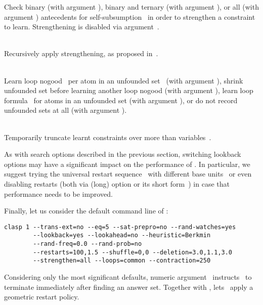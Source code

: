 \begin{description}
Check binary (with argument ),
binary and ternary (with argument ), or 
all (with argument ) antecedents for
self-subsumption~\cite{eenbie05a}
in order to strengthen a constraint to learn.
Strengthening is disabled via argument~.
\item[\code{--recursive-str}]~\\
Recursively apply strengthening, as proposed in~\cite{soreen05a}.
\item[\code{--loops common|distinct|shared|no}]~\\
Learn loop nogood~\cite{gekanesc07a} per atom in an unfounded set~\cite{gerosc91a}
(with argument ),
shrink unfounded set before learning another loop nogood
(with argument ),
learn loop formula~\cite{linzha04a} for atoms in an unfounded set
(with argument ),
or do not record unfounded sets at all
(with argument ).
\item[\code{--contraction \textit{n}}]~\\
Temporarily truncate learnt constraints over more than  variables~\cite{ryan04a}.
\end{description}
%
As with search options described in the previous section,
switching lookback options may have a significant impact on the
performance of \clasp.
In particular, we suggest trying the universal restart sequence~\cite{lusizu93a}
with different base units~ or even disabling restarts
(both via (long) option  or its short form~)
in case that performance needs to be improved.

Finally, let us consider the default command line of \clasp:
%
\begin{lstlisting}[numbers=none]
clasp 1 --trans-ext=no --eq=5 --sat-prepro=no --rand-watches=yes
        --lookback=yes --lookahead=no --heuristic=Berkmin
        --rand-freq=0.0 --rand-prob=no
        --restarts=100,1.5 --shuffle=0,0 --deletion=3.0,1.1,3.0
        --strengthen=all --loops=common --contraction=250
\end{lstlisting}
%
Considering only the most significant defaults,
numeric argument~ instructs \clasp\ to terminate immediately
after finding an answer set.
Together with ,  lets \clasp\ apply a geometric
restart policy.

